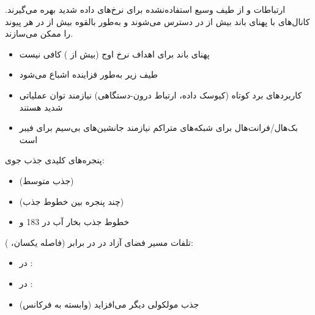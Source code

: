 

\CNchained{}

\CNchained{}

ارتباطات  و  از طیف وسیع استفاده‌نشده برای نرخ‌های داده شدید بهره می‌گیرند. کانال‌های با پهنای باند بیش از  در دسترس می‌شوند و به‌طور بالقوه بیش از  در هر پیوند را ممکن می‌سازند.


\begin{itemize}
\tightlist
\item
  پهنای باند  برای اهداف نرخ اوج  (بیش از ) کافی نیست
\item
  طیف زیر  به‌طور فزاینده اشباع می‌شود
\item
  کاربردهای برد کوتاه (کیوسک داده، ارتباط درون-دستگاهی) نیازمند توان عملیاتی شدید هستند
\item
  بک‌هال/\allowbreak{}فرانت‌هال برای شبکه‌های متراکم نیازمند جانشین‌های بی‌سیم برای فیبر است
\end{itemize}




پنجره‌های کلیدی جذب جوی:

\begin{itemize}
\tightlist
\item
   (جذب متوسط)
\item
   (چند پنجره بین خطوط جذب)
\item
  خطوط جذب بخار آب در 183 و 
\end{itemize}


تلفات مسیر فضای آزاد در  در برابر  (فاصله یکسان، ):


\begin{itemize}
\tightlist
\item
  در : 
\item
  در : 
\item
  جذب مولکولی  دیگر می‌افزاید (وابسته به فرکانس)
\end{itemize}

